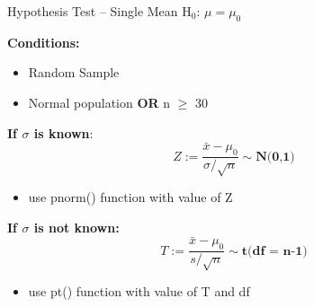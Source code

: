 \documentclass{beamer}
\begin{document}
\begin{frame}{Hypothesis Test -- Single Mean}
H$_0$: $\mu = \mu_0$ \vspace{3mm}

\textbf{Conditions:}
\begin{itemize}
    \item Random Sample
    \item Normal population \textbf{OR} n $\geq$ 30
\end{itemize} \vspace{3mm}

\textbf{If $\sigma$ is known}:
\begin{equation*}
    Z := \frac{\bar{x}-\mu_0}{\sigma / \sqrt{n}} \sim \textbf{N(0,1)}
\end{equation*} \vspace{-4mm}
\begin{itemize}
    \item use pnorm() function with value of Z
\end{itemize} \vspace{2mm}

\textbf{If $\sigma$ is not known:}
\begin{equation*}
    T := \frac{\bar{x}-\mu_0}{s / \sqrt{n}} \sim \textbf{t(df = n-1)}
\end{equation*} \vspace{-4mm}
\begin{itemize}
    \item use pt() function with value of T and df
\end{itemize}
\end{frame}
\end{document}
